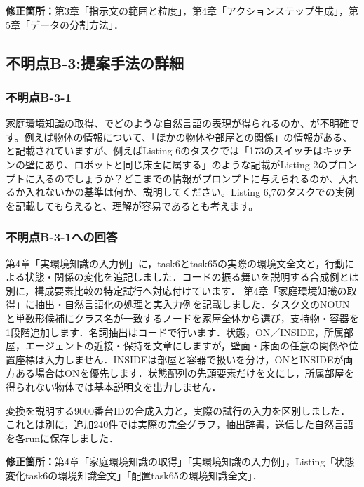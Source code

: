 \documentclass{jsarticle}
\begin{document}
\noindent\textbf{修正箇所：}第3章「指示文の範囲と粒度」，第4章「アクションステップ生成」，第5章「データの分割方法」．


\subsection*{不明点B-3:提案手法の詳細}
\subsubsection*{不明点B-3-1}
\begin{screen}
家庭環境知識の取得、でどのような自然言語の表現が得られるのか、が不明確です。例えば物体の情報について、「ほかの物体や部屋との関係」の情報がある、と記載されていますが、例えばListing 6のタスクでは「173のスイッチはキッチンの壁にあり、ロボットと同じ床面に属する」のような記載がListing 2のプロンプトに入るのでしょうか？どこまでの情報がプロンプトに与えられるのか、入れるか入れないかの基準は何か、説明してください。Listing 6,7のタスクでの実例を記載してもらえると、理解が容易であるとも考えます。
\end{screen}
\subsubsection*{不明点B-3-1への回答}
第4章「実環境知識の入力例」に，task6とtask65の実際の環境文全文と，行動による状態・関係の変化を追記しました．コードの振る舞いを説明する合成例とは別に，構成要素比較の特定試行へ対応付けています．
第4章「家庭環境知識の取得」に抽出・自然言語化の処理と実入力例を記載しました．タスク文のNOUNと単数形候補にクラス名が一致するノードを家屋全体から選び，支持物・容器を1段階追加します．名詞抽出はコードで行います．状態，ON／INSIDE，所属部屋，エージェントの近接・保持を文章にしますが，壁面・床面の任意の関係や位置座標は入力しません．INSIDEは部屋と容器で扱いを分け，ONとINSIDEが両方ある場合はONを優先します．状態配列の先頭要素だけを文にし，所属部屋を得られない物体では基本説明文を出力しません．

変換を説明する9000番台IDの合成入力と，実際の試行の入力を区別しました．これとは別に，追加240件では実際の完全グラフ，抽出辞書，送信した自然言語を各runに保存しました．

\noindent\textbf{修正箇所：}第4章「家庭環境知識の取得」「実環境知識の入力例」，Listing「状態変化task6の環境知識全文」「配置task65の環境知識全文」．

\end{document}

